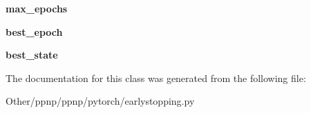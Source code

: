 \begin{DoxyCompactItemize}
{\bfseries max\+\_\+epochs}
\item 
\mbox{\label{classppnp_1_1pytorch_1_1earlystopping_1_1EarlyStopping_ab08d5f7ec446645fb3123a3f04dc8e6d}} 
{\bfseries best\+\_\+epoch}
\item 
\mbox{\label{classppnp_1_1pytorch_1_1earlystopping_1_1EarlyStopping_a5496e2e4b5207a77bba618bdbc0e5312}} 
{\bfseries best\+\_\+state}
\end{DoxyCompactItemize}


The documentation for this class was generated from the following file\+:\begin{DoxyCompactItemize}
\item 
Other/ppnp/ppnp/pytorch/earlystopping.\+py\end{DoxyCompactItemize}
